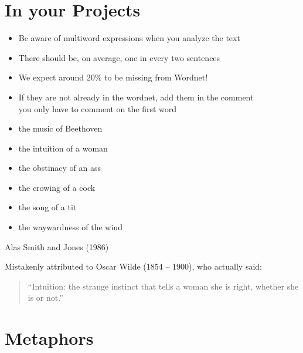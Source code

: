 \documentclass[a4paper,landscape,headrule,footrule,xetex]{foils}
\begin{document}
\section{In your  Projects}

\begin{itemize}
\item Be aware of multiword expressions when you analyze the text
\item There should be, on average, one in every two sentences
\item We expect around 20\% to be missing from Wordnet!  
\item If they are not already in the wordnet, add them in the comment
  \\ you only have to comment on the first word
\end{itemize}





\begin{itemize} \addtolength{\itemsep}{-1ex}
\item the music of Beethoven
\item the intuition of a woman
\item the obstinacy of an ass
\item the crowing of a cock
\item the song of a tit
\item the waywardness of the wind
\end{itemize}
\begin{flushright}
  Alas Smith and Jones (1986)
\end{flushright}
Mistakenly attributed to Oscar Wilde (1854 – 1900), who actually said:
\begin{quote}
``Intuition: the strange instinct that tells a woman she is right, whether she is or not.''  
\end{quote}



\section{Metaphors}
\end{document}
